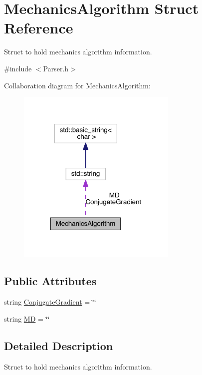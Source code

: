 \hypertarget{structMechanicsAlgorithm}{\section{Mechanics\+Algorithm Struct Reference}
\label{structMechanicsAlgorithm}
}


Struct to hold mechanics algorithm information.  




{\ttfamily \#include $<$Parser.\+h$>$}



Collaboration diagram for Mechanics\+Algorithm\+:\nopagebreak
\begin{figure}[H]
\begin{center}
\leavevmode
\includegraphics[width=217pt]{structMechanicsAlgorithm__coll__graph}
\end{center}
\end{figure}
\subsection*{Public Attributes}
\begin{DoxyCompactItemize}
\item 
string \hyperlink{structMechanicsAlgorithm_abd82cd76a29d682076fe9e7d34c5ad4c}{Conjugate\+Gradient} = \char`\"{}\char`\"{}
\item 
string \hyperlink{structMechanicsAlgorithm_a50ed844650374782f88fb677c78c4120}{M\+D} = \char`\"{}\char`\"{}
\end{DoxyCompactItemize}


\subsection{Detailed Description}
Struct to hold mechanics algorithm information. 


